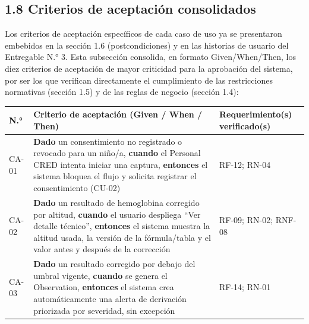 \documentclass[11pt,a4paper]{article}
\begin{document}
\subsection{1.8 Criterios de aceptación consolidados}\label{criterios-de-aceptaciuxf3n-consolidados}

Los criterios de aceptación específicos de cada caso de uso ya se presentaron embebidos en la sección 1.6 (postcondiciones) y en las historias de usuario del Entregable N.° 3. Esta subsección consolida, en formato Given/When/Then, los diez criterios de aceptación de mayor criticidad para la aprobación del sistema, por ser los que verifican directamente el cumplimiento de las restricciones normativas (sección 1.5) y de las reglas de negocio (sección 1.4):

{\small
\begin{longtable}[]{@{}
  >{\raggedright\arraybackslash}p{}
  >{\raggedright\arraybackslash}p{}
  >{\raggedright\arraybackslash}p{}@{}}
\toprule\noalign{}
\begin{minipage}[b]{\linewidth}\raggedright
N.°
\end{minipage} & \begin{minipage}[b]{\linewidth}\raggedright
Criterio de aceptación (Given / When / Then)
\end{minipage} & \begin{minipage}[b]{\linewidth}\raggedright
Requerimiento(s) verificado(s)
\end{minipage} \\
\midrule\noalign{}
\endhead
\bottomrule\noalign{}
\endlastfoot
CA-01 & \textbf{Dado} un consentimiento no registrado o revocado para un niño/a, \textbf{cuando} el Personal CRED intenta iniciar una captura, \textbf{entonces} el sistema bloquea el flujo y solicita registrar el consentimiento (CU-02) & RF-12; RN-04 \\
CA-02 & \textbf{Dado} un resultado de hemoglobina corregido por altitud, \textbf{cuando} el usuario despliega ``Ver detalle técnico'', \textbf{entonces} el sistema muestra la altitud usada, la versión de la fórmula/tabla y el valor antes y después de la corrección & RF-09; RN-02; RNF-08 \\
CA-03 & \textbf{Dado} un resultado corregido por debajo del umbral vigente, \textbf{cuando} se genera el Observation, \textbf{entonces} el sistema crea automáticamente una alerta de derivación priorizada por severidad, sin excepción & RF-14; RN-01 \\

\end{longtable}}
\end{document}
